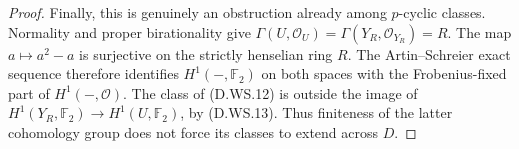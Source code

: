 \begin{proof}
Finally, this is genuinely an obstruction already among
$p$-cyclic classes. Normality and proper birationality give
$\Gamma(U,\mathcal O_U)=\Gamma(Y_R,\mathcal O_{Y_R})=R$.
The map $a\mapsto a^2-a$ is surjective on the strictly
henselian ring $R$. The Artin--Schreier exact sequence
therefore identifies $H^1(-,\mathbb F_2)$ on both spaces
with the Frobenius-fixed part of $H^1(-,\mathcal O)$.
The class of (D.WS.12) is outside the image of
$H^1(Y_R,\mathbb F_2)\to H^1(U,\mathbb F_2)$, by
(D.WS.13). Thus finiteness of the latter cohomology group
does not force its classes to extend across $D$.
\end{proof}
